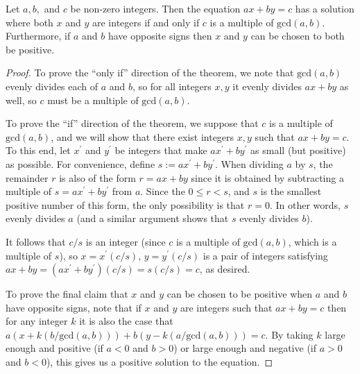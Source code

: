 
\begin{theorem}\label{thm:linear_diophantine}
	Let $a, b,$ and $c$ be non-zero integers. Then the equation $ax + by = c$ has a solution where both $x$ and $y$ are integers if and only if $c$ is a multiple of $\mathrm{gcd}(a,b)$. Furthermore, if $a$ and $b$ have opposite signs then $x$ and $y$ can be chosen to both be positive.
\end{theorem}

\begin{proof}
	To prove the ``only if'' direction of the theorem, we note that $\mathrm{gcd}(a,b)$ evenly divides each of $a$ and $b$, so for all integers $x,y$ it evenly divides $ax + by$ as well, so $c$ must be a multiple of $\mathrm{gcd}(a,b)$.
	
	To prove the ``if'' direction of the theorem, we suppose that $c$ is a multiple of $\mathrm{gcd}(a,b)$, and we will show that there exist integers $x,y$ such that $ax+by = c$. To this end, let $x^\prime$ and $y^\prime$ be integers that make $ax^\prime + by^\prime$ as small (but positive) as possible. For convenience, define $s := ax^\prime + by^\prime$. When dividing $a$ by $s$, the remainder $r$ is also of the form $r = ax + by$ since it is obtained by subtracting a multiple of $s = ax^\prime + by^\prime$ from $a$. Since the $0 \leq r < s$, and $s$ is the smallest positive number of this form, the only possibility is that $r = 0$. In other words, $s$ evenly divides $a$ (and a similar argument shows that $s$ evenly divides $b$).
	
	It follows that $c/s$ is an integer (since $c$ is a multiple of $\mathrm{gcd}(a,b)$, which is a multiple of $s$), so $x = x^\prime(c/s)$, $y = y^\prime(c/s)$ is a pair of integers satisfying $ax + by = (ax^\prime + by^\prime)(c/s) = s(c/s) = c$, as desired.
	
	To prove the final claim that $x$ and $y$ can be chosen to be positive when $a$ and $b$ have opposite signs, note that if $x$ and $y$ are integers such that $ax + by = c$ then for any integer $k$ it is also the case that $a(x + k(b/\mathrm{gcd}(a,b))) + b(y - k(a/\mathrm{gcd}(a,b))) = c$. By taking $k$ large enough and positive (if $a < 0$ and $b > 0$) or large enough and negative (if $a > 0$ and $b < 0$), this gives us a positive solution to the equation.
\end{proof}

